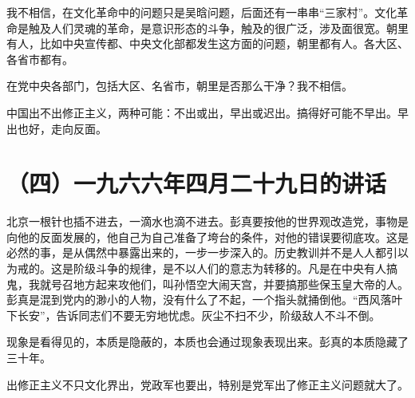 我不相信，在文化革命中的问题只是吴晗问题，后面还有一串串“三家村”。文化革命是触及人们灵魂的革命，是意识形态的斗争，触及的很广泛，涉及面很宽。朝里有人，比如中央宣传都、中央文化部都发生这方面的问题，朝里都有人。各大区、各省市都有。

在党中央各部门，包括大区、名省市，朝里是否那么干净？我不相信。

中国出不出修正主义，两种可能：不出或出，早出或迟出。搞得好可能不早出。早出也好，走向反面。

\section*{（四）一九六六年四月二十九日的讲话}

北京一根针也插不进去，一滴水也滴不进去。彭真要按他的世界观改造党，事物是向他的反面发展的，他自己为自己准备了垮台的条件，对他的错误要彻底攻。这是必然的事，是从偶然中暴露出来的，一步一步深入的。历史教训并不是人人都引以为戒的。这是阶级斗争的规律，是不以人们的意志为转移的。凡是在中央有人搞鬼，我就号召地方起来攻他们，叫孙悟空大闹天宫，并要搞那些保玉皇大帝的人。彭真是混到党内的渺小的人物，没有什么了不起，一个指头就捅倒他。“西风落叶下长安”，告诉同志们不要无穷地忧虑。灰尘不扫不少，阶级敌人不斗不倒。

现象是看得见的，本质是隐蔽的，本质也会通过现象表现出来。彭真的本质隐藏了三十年。

出修正主义不只文化界出，党政军也要出，特别是党军出了修正主义问题就大了。

